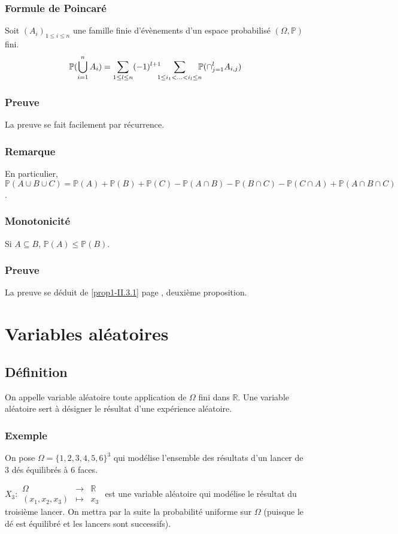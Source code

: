 \documentclass[a4paper,10pt]{book} %
\newcommand{\R}{\mathbb{R}}
\renewcommand{\P}{\mathbb{P}} %
\begin{document}
\subsubsection{Formule de Poincaré}
Soit $(A_i)_{1\leq i\leq n}$ une famille finie d'évènements d'un espace probabilisé $(\Omega,\P)$ fini.
$$ \P(\bigcup_{i=1}^nA_i)=\sum_{1\leq l\leq n}(-1)^{l+1}~~~~\sum_{\mathclap{1\leq i_1<...<i_l\leq n}}~~~~\P(\cap_{j=1}^lA_{i,j}) $$

\subsubsection{Preuve}
La preuve se fait facilement par récurrence.

\subsubsection{Remarque}
En particulier, $\P(A\cup B\cup C)=\P(A)+\P(B)+\P(C)-\P(A\cap B)-\P(B\cap C)-\P(C\cap A)+\P(A\cap B\cap C)$.

\subsubsection{Monotonicité}
Si $A\subseteq B$, $\P(A)\leq \P(B)$.

\subsubsection{Preuve}
La preuve se déduit de \ref{prop1-II.3.1} page \pageref{prop1-II.3.1}, deuxième proposition.

\section{Variables aléatoires}
\subsection{Définition}
On appelle variable aléatoire toute application de $\Omega$ fini dans $\R$. Une variable aléatoire sert à désigner le résultat d'une expérience aléatoire.

\subsubsection{Exemple}
On pose $\Omega=\{1,2,3,4,5,6\}^3$ qui modélise l'ensemble des résultats d'un lancer de 3 dés équilibrés à 6 faces.

$X_3:\begin{array}{rcl}
\Omega&\rightarrow& \R\\
(x_1,x_2,x_3)&\mapsto& x_3
\end{array}$ est une variable aléatoire qui modélise le résultat du troisième lancer. On mettra par la suite la probabilité uniforme sur $\Omega$ (puisque le dé est équilibré et les lancers sont successifs).
\end{document}
